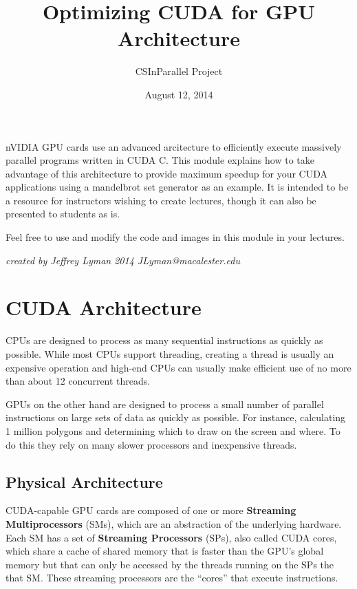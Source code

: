 \documentclass[letterpaper,10pt,openany,oneside]{sphinxmanual}
\title{Optimizing CUDA for GPU Architecture}
\date{August 12, 2014}
\author{CSInParallel Project}
\begin{document}
\maketitle
\tableofcontents
{}\label{index::doc}


nVIDIA GPU cards use an advanced arcitecture to efficiently execute
massively parallel programs written in CUDA C. This module explains how to take
advantage of this architecture to provide maximum speedup for
your CUDA applications using a mandelbrot set generator as an
example. It is intended to be a resource for instructors wishing
to create lectures, though it can also be presented to students
as is.

Feel free to use and modify the code and images in this module
in your lectures.

\emph{created by Jeffrey Lyman 2014 JLyman@macalester.edu}


\chapter{CUDA Architecture}
\label{0-Architecture/Architecture:optimizing-cuda-for-gpu-architecture}\label{0-Architecture/Architecture::doc}\label{0-Architecture/Architecture:cuda-architecture}
CPUs are designed to process as many sequential instructions as
quickly as possible. While most CPUs support threading, creating
a thread is usually an expensive operation and high-end CPUs can
usually make efficient use of no more than about 12 concurrent threads.

GPUs on the other hand are designed to process a small number of
parallel instructions on large sets of data as quickly as
possible. For instance, calculating 1 million polygons and
determining which to draw on the screen and where. To do this they
rely on many slower processors and inexpensive threads.


\section{Physical Architecture}
\label{0-Architecture/Architecture:physical-architecture}
CUDA-capable GPU cards are composed of one or more \textbf{Streaming Multiprocessors}
(SMs), which are an abstraction of the underlying hardware.
Each SM has a set of \textbf{Streaming Processors} (SPs), also called CUDA cores, which share a cache of shared memory
that is faster than the GPU's global memory but that can only be accessed by the threads
running on the SPs the that SM.  These streaming processors are the ``cores'' that
execute instructions.
\end{document}

